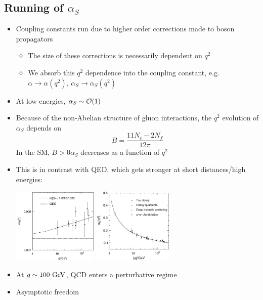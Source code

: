 \subsection{Running of $\alpha_S$}
\begin{itemize}
  \item Coupling constants run due to higher order corrections made to boson propagators
  \begin{itemize}
    \item The size of these corrections is necessarily dependent on $q^2$
    \item We absorb this $q^2$ dependence into the coupling constant, e.g. $\alpha\rightarrow\alpha(q^2)$, $\alpha_S\rightarrow \alpha_S(q^2)$
  \end{itemize}
  \item At low energies, $\alpha_S \sim \mathcal{O}(1)$
  \item Because of the non-Abelian structure of gluon interactions, the $q^2$ evolution of $\alpha_S$ depends on 
  \begin{equation}
    B = \frac{11N_c-2N_f}{12\pi}
  \end{equation}
  In the SM, $B>0$\thus $\alpha_S$ decreases as a function of $q^2$
  \item This is in contrast with QED, which gets stronger at short distances/high energies:
  \begin{center}
    \includegraphics[width=0.32\textwidth]{figs/alpharun.png}\hspace{5mm}
    \includegraphics[width=0.3\textwidth]{figs/alphaSrun.png}
  \end{center}
  \item At $q\sim 100~\text{GeV}$, QCD enters a perturbative regime
  \item Asymptotic freedom

\end{itemize}
